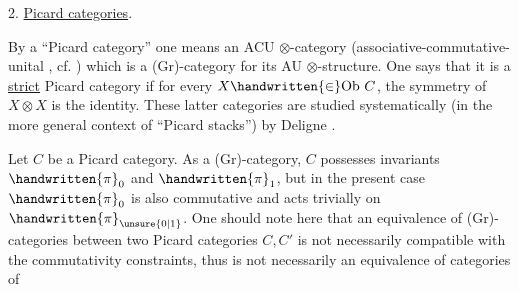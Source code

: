 2. \uline{Picard categories}.

By a ``Picard category'' one means an ACU $\otimes$-category (associative-commutative-unital , cf. \handwritten{[\, ]}) which is a (Gr)-category for its  AU $\otimes$-structure. One says that it is a \uline{strict} Picard category if for every $X\handwritten{\in}\mathrm{Ob}\ C$, the symmetry of $X\otimes X$ is the identity. These  latter categories are studied systematically (in the more general context of ``Picard stacks'') by Deligne \handwritten{[\, ]}.

Let $C$ be a Picard category. As a (Gr)-category, $C$ possesses invariants $\handwritten{\pi}_{0}$ and $\handwritten{\pi}_{1}$, but in the present case $\handwritten{\pi}_{0}$ is also commutative and acts trivially on $\handwritten{\pi}_{\unsure{0|1}}$. One should note here that an equivalence of (Gr)-categories between two Picard categories $C,C'$ is not necessarily compatible with the commutativity constraints, thus is not necessarily an equivalence of categories of
